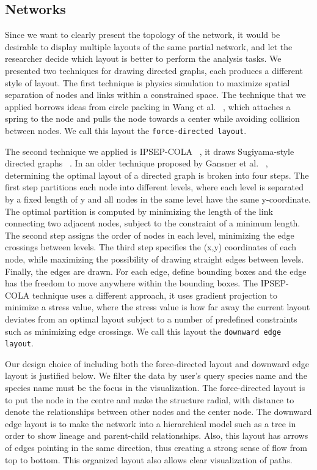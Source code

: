 \documentclass[journal]{vgtc}                %
\begin{document}
\subsection{Networks}
Since we want to clearly present the topology of the network, it would be desirable to display multiple layouts of the same partial network, and let the researcher decide which layout is better to perform the analysis tasks. We presented two techniques for drawing directed graphs, each produces a different style of layout. The first technique is physics simulation to maximize spatial separation of nodes and links within a constrained space. The technique that we applied borrows ideas from circle packing in Wang et al. ~\cite{wang2006visualization}, which attaches a spring to the node and pulls the node towards a center while avoiding collision between nodes. We call this layout the \texttt{force-directed layout}.

The second technique we applied is IPSEP-COLA ~\cite{dwyer2006ipsep}, it draws Sugiyama-style directed graphs ~\cite{wakamori1982layered}. In an older technique proposed by Gansner et al. ~\cite{gansner1993technique}, determining the optimal layout of a directed graph is broken into four steps. The first step partitions each node into different levels, where each level is separated by a fixed length of y and all nodes in the same level have the same y-coordinate. The optimal partition is computed by minimizing the length of the link connecting two adjacent nodes, subject to the constraint of a minimum length. The second step assigns the order of nodes in each level, minimizing the edge crossings between levels. The third step specifies the (x,y) coordinates of each node, while maximizing the possibility of drawing straight edges between levels. Finally, the edges are drawn. For each edge, define bounding boxes and the edge has the freedom to move anywhere within the bounding boxes. The IPSEP-COLA technique uses a different approach, it uses gradient projection to minimize a stress value, where the stress value is how far away the current layout deviates from an optimal layout subject to a number of predefined constraints such as minimizing edge crossings. We call this layout the \texttt{downward edge layout}. 

Our design choice of including both the force-directed layout and downward edge layout is justified below. We filter the data by user’s query species name and the species name must be the focus in the visualization. The force-directed layout is to put the node in the centre and make the structure radial, with distance to denote the relationships between other nodes and the center node. The downward edge layout is to make the network into a hierarchical model such as a tree in order to show lineage and parent-child relationships. Also, this layout has arrows of edges pointing in the same direction, thus creating a strong sense of flow from top to bottom. This organized layout also allows clear visualization of paths.
\end{document}
